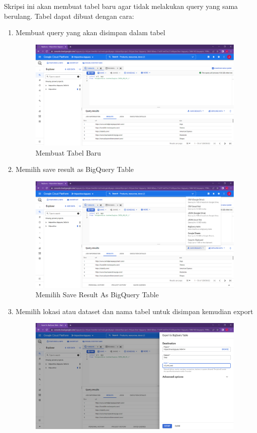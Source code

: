 Skripsi ini akan membuat tabel baru agar tidak melakukan query yang sama berulang. Tabel dapat dibuat dengan cara:
\begin{enumerate}
	\item Membuat query yang akan disimpan dalam tabel
	\begin{figure}[H]
	\centering  
	\includegraphics[scale=0.35]{Gambar/membuat query.PNG}  
	\caption{Membuat Tabel Baru} 
	\label{fig:create_table} 
\end{figure}
	\item Memilih save result as BigQuery Table
	\begin{figure}[H]
		\centering  
		\includegraphics[scale=0.35]{Gambar/save bigquery table.PNG}  
		\caption{Memilih Save Result As BigQuery Table} 
		\label{fig:save_table}
	\end{figure}
	\item Memilih lokasi atau dataset dan nama tabel untuk disimpan kemudian export
	\begin{figure}[H]
		\centering  
		\includegraphics[scale=0.35]{Gambar/export table.PNG}  

\end{figure}
\end{enumerate}
